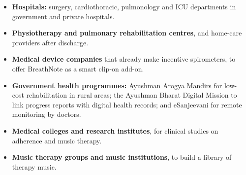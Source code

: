 \documentclass[12pt,a4paper]{article}
\begin{document}
\begin{itemize}
  \item \textbf{Hospitals:} surgery, cardiothoracic, pulmonology and ICU departments in government and private hospitals.
  \item \textbf{Physiotherapy and pulmonary rehabilitation centres}, and home-care providers after discharge.
  \item \textbf{Medical device companies} that already make incentive spirometers, to offer BreathNote as a smart clip-on add-on.
  \item \textbf{Government health programmes:} Ayushman Arogya Mandirs for low-cost rehabilitation in rural areas; the Ayushman Bharat Digital Mission to link progress reports with digital health records; and eSanjeevani for remote monitoring by doctors.
  \item \textbf{Medical colleges and research institutes}, for clinical studies on adherence and music therapy.
  \item \textbf{Music therapy groups and music institutions}, to build a library of therapy music.
\end{itemize}
\end{document}
